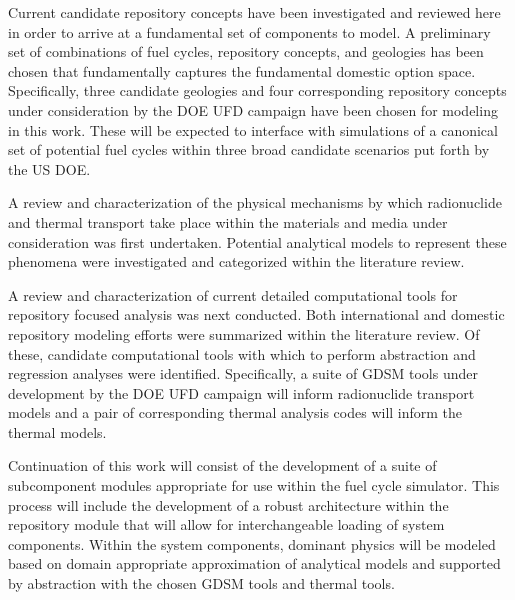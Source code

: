 Current candidate repository concepts have been investigated and reviewed here 
in order to arrive at a fundamental set of components to model. A preliminary 
set of combinations of fuel cycles, repository concepts, and geologies has 
been chosen that fundamentally captures the fundamental domestic option space. 
Specifically, three candidate geologies and four corresponding repository 
concepts under consideration by the \gls{DOE} \gls{UFD} campaign have been 
chosen for modeling in this work. These will be expected to interface
with \Cyclus simulations of a canonical set of potential fuel cycles within 
three broad candidate scenarios put forth by the \gls{US} \gls{DOE}.



A review and characterization of the physical mechanisms by which radionuclide 
and thermal transport take place within the materials and media under 
consideration was first undertaken. Potential analytical models to represent  
these phenomena were investigated and categorized within the literature review. 


A review and characterization of current detailed computational tools for
repository focused analysis was next conducted. Both international and domestic
repository modeling efforts were summarized within the literature review. Of 
these, candidate computational tools with which to perform abstraction and 
regression analyses were identified. Specifically, a suite of \gls{GDSM} tools 
under development by the \gls{DOE} \gls{UFD} campaign will inform  radionuclide 
transport models and a pair of corresponding thermal analysis codes will inform 
the thermal models.
 

Continuation of this work will consist of the development of a suite of 
subcomponent modules appropriate for use within the \Cyclus fuel cycle 
simulator.  This process will include the development of a robust architecture 
within the repository module that will allow for interchangeable loading of 
system components.  Within the system components, dominant physics will be 
modeled based on domain appropriate approximation of analytical models and 
supported by abstraction with the chosen \gls{GDSM} tools and thermal tools. 


